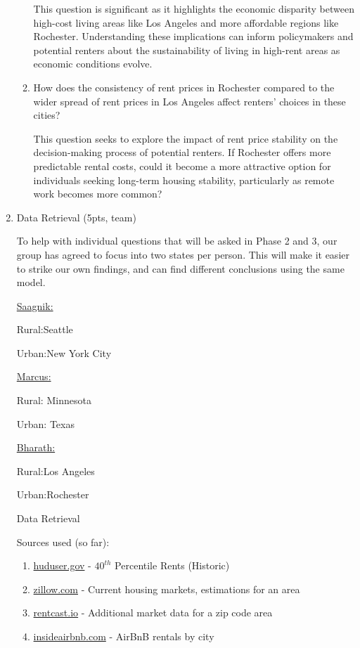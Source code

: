 \documentclass[a4paper]{article}
\begin{document}
\begin{enumerate}
\begin{enumerate}
    This question is significant as it highlights the economic disparity between high-cost living areas like Los Angeles and more affordable regions like Rochester. Understanding these implications can inform policymakers and potential renters about the sustainability of living in high-rent areas as economic conditions evolve.

    \bigbreak
    \item How does the consistency of rent prices in Rochester compared to the wider spread of rent prices in Los Angeles affect renters' choices in these cities?

    This question seeks to explore the impact of rent price stability on the decision-making process of potential renters. If Rochester offers more predictable rental costs, could it become a more attractive option for individuals seeking long-term housing stability, particularly as remote work becomes more common?

\end{enumerate}


  \item Data Retrieval (5pts, team)
  
  To help with individual questions that will be asked in Phase 2 and 3, our group has agreed to focus into two states per person. This will make it easier to strike our own findings, and can find different conclusions using the same model.

  \underline{Saagnik:}

  Rural:Seattle

  Urban:New York City


  \underline{Marcus:}

  Rural: Minnesota

  Urban: Texas

  \underline{Bharath:}

  Rural:Los Angeles

  Urban:Rochester

  \bigbreak
  \begin{center}
    Data Retrieval
  \end{center}

  Sources used (so far):
  \begin{enumerate}
    \item \href{https://www.huduser.gov/portal/datasets/fmr.html#null}{huduser.gov} - $40^{th}$ Percentile Rents (Historic)
    \item \href{https://www.zillow.com/research/data/}{zillow.com} - Current housing markets, estimations for an area
    \item \href{https://www.rentcast.io/api}{rentcast.io} - Additional market data for a zip code area
    \item \href{https://insideairbnb.com/get-the-data/}{insideairbnb.com} - AirBnB rentals by city
  \end{enumerate}


\end{enumerate}
\end{document}
